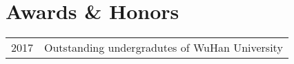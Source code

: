 \section*{Awards \& Honors}

\begin{tabular}{p{} p{}}
2017 & Outstanding undergradutes of WuHan University \\
\end{tabular}
